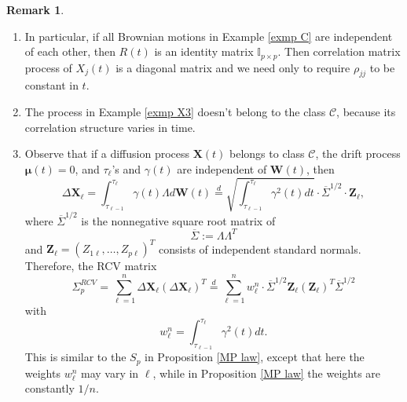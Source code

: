 \documentclass[a4paper,11pt]{article}
\theoremstyle{plain}
\theoremstyle{definition}
\newtheorem{rmrk}[thm]{Remark}
\begin{document}
    \begin{rmrk} \
    	\begin{enumerate}
    		\item In particular, if all Brownian motions in Example \ref{exmp C} are independent of each other, then $R(t)$ is an identity matrix $\mathbb{I}_{p \times p}$. Then correlation matrix process of $X_j(t)$ is a diagonal matrix and we need only to require $\rho_{jj}$ to be constant in $t$. 
    		\item The process in Example \ref{exmp X3} doesn't belong to the class $\mathcal{C}$, because its correlation structure varies in time.
    		\item Observe that if a diffusion process $\mathbf{X}(t)$ belongs to class $\mathcal{C}$, the drift process $\boldsymbol{\mu}(t) = 0$, and $\tau_\ell$'s and $\gamma(t)$ are independent of $\mathbf{W}(t)$, then
    		\[ \Delta \mathbf{X}_\ell = \int_{\tau_{\ell-1}}^{\tau_\ell} \gamma(t) \Lambda d\mathbf{W}(t) \stackrel{d}{=} \sqrt{\int_{\tau_{\ell-1}}^{\tau_\ell} \gamma^2(t)dt} \cdot \overline{\Sigma}^{1/2} \cdot \mathbf{Z}_\ell, \]
    		where $ \overline{\Sigma}^{1/2}$ is the nonnegative square root matrix of
    		\[\overline{\Sigma} := \Lambda \Lambda^T \]
    		and $\mathbf{Z}_\ell = (Z_{1\ell}, \dots, Z_{p\ell})^T$ consists of independent standard normals. Therefore, the RCV matrix
    		\[ \Sigma_p^{RCV} = \sum_{\ell=1}^{n} \Delta \mathbf{X}_\ell(\Delta \mathbf{X}_\ell)^T \stackrel{d}{=} \sum_{\ell=1}^{n} w_\ell^n \cdot \overline{\Sigma}^{1/2}\mathbf{Z}_\ell (\mathbf{Z}_\ell)^T \overline{\Sigma}^{1/2} \]
    		with 
    		\[w_\ell^n =\int_{\tau_{\ell-1}}^{\tau_\ell} \gamma^2(t)dt.\]
    		This is similar to the $S_p$ in Proposition \ref{MP law}, except that here the weights $w_\ell^n$ may vary in $\ell$, while in Proposition \ref{MP law} the weights are constantly $1/n$.
    	\end{enumerate}
    \end{rmrk}
    
\end{document}
